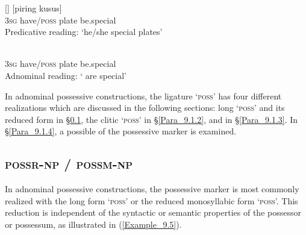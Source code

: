 \ea
\label{Example_9.4}
\ea
\label{Example_9.4a}
\gll {[de]} {[]} {[piring} {kusus]}\\ %
   \textsc{3sg}  have/\textsc{poss}  plate  be.special\\
\glt Predicative reading: ‘he/she  special plates’ \textstyleExampleSource{[081006-029-CvEx.0016]}\\
\vspace{5pt}

\ex
\label{Example_9.4b}
\\
   \textsc{3sg}  have/\textsc{poss}  plate  be.special\\
\glt Adnominal reading: ‘ are special’ \textstyleExampleSource{[081006-029-CvEx.0016]}\\
\z
\z


In adnominal possessive constructions, the ligature  ‘\textsc{poss}’ has four different realizations which are discussed in the following sections: long  ‘\textsc{poss}’ and its reduced form  in §\ref{Para_9.1.1}, the clitic  ‘\textsc{poss}’ in §\ref{Para_9.1.2}, and  in §\ref{Para_9.1.3}. In §\ref{Para_9.1.4}, a possible  of the possessive marker is examined.


\subsection{\textsc{possr-np} / \textsc{possm-np}}
\label{Para_9.1.1}
In adnominal possessive constructions, the possessive marker is most commonly realized with the long form  ‘\textsc{poss}’ or the reduced monosyllabic form  ‘\textsc{poss}’. This reduction is independent of the syntactic or semantic properties of the possessor or possessum, as illustrated in (\ref{Example_9.5}).



